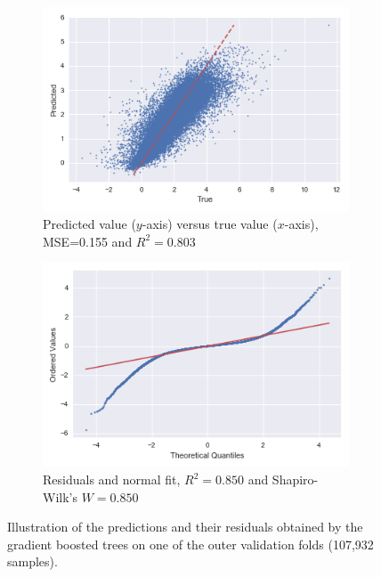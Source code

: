 \documentclass[a4paper,11pt]{kth-mag}
\begin{document}
\begin{figure}
    \centering
    \begin{subfigure}[t]{0.49\textwidth}
        \centering
        \includegraphics[width=\textwidth]{images/residuals_scatter}
        \caption{Predicted value ($y$-axis) versus true value ($x$-axis), MSE=0.155 and $R^2=0.803$}
        \label{fig:residuals_scatter}
    \end{subfigure}
    \hfill
    \begin{subfigure}[t]{0.49\textwidth}
        \centering
        \includegraphics[width=\textwidth]{images/residuals_probplot}
        \caption{Residuals and normal fit, $R^2=0.850$ and Shapiro-Wilk's $W=0.850$}
        \label{fig:residuals_probplot}
    \end{subfigure}
    \caption{Illustration of the predictions and their residuals obtained by the gradient boosted trees on one of the outer validation folds (107,932 samples).}
	\label{fig:residuals}
\end{figure}
\end{document}

